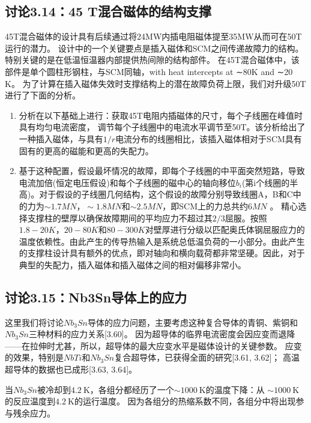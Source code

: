 \subsection{讨论3.14：45 T混合磁体的结构支撑}
45T混合磁体的设计具有后续通过将24MW内插电阻磁体提至35MW从而可在50T运行的潜力。
设计中的一个关键要点是插入磁体和SCM之间传递故障力的结构。
特别关键的是在低温恒温器内部提供热间隙的结构部件。
在45T混合磁体中，该部件是单个圆柱形钢柱，与SCM同轴，with heat intercepts at ∼80K and ∼20 K。
为了计算在插入磁体失效时支撑结构上的潜在故障负荷上限，我们对升级50T进行了下面的分析。
\begin{enumerate}
	\item 分析在以下基础上进行：获取45T电阻内插磁体的尺寸，每个子线圈在峰值时具有均匀电流密度，
	调节每个子线圈中的电流水平调节至50T。该分析给出了一种插入磁体，与具有$1 / r$电流分布的线圈相比，该插入磁体相对于SCM具有固有的更高的磁能和更高的失配力。
	
	\item 基于这种配置，假设最坏情况的故障，即每个子线圈的中平面突然短路，导致电流加倍(恒定电压假设)和每个子线圈的磁中心的轴向移位$b_i$(第i个线圈的半高)。对于假设的子线圈几何结构，这个假设的故障分别导致线圈A，B和C中的力为$\sim 1.7 MN，\sim 1.8 MN$和$\sim 2.5 MN$，即SCM上的力总共约$6 MN$ 。
	精心选择支撑柱的壁厚以确保故障期间的平均应力不超过其$2/3$屈服。按照$1.8-20 K，20-80 K$和$80-300 K$对壁厚进行分级以匹配奥氏体钢屈服应力的温度依赖性。由此产生的传导热输入是系统总低温负荷的一小部分。由此产生的支撑柱设计具有额外的优点，即对轴向和横向载荷都非常坚硬。因此，对于典型的失配力，插入磁体和插入磁体之间的相对偏移非常小。
\end{enumerate}
\newpage



\subsection{讨论3.15：Nb3Sn导体上的应力}
这里我们将讨论$Nb_3Sn$导体的应力问题，主要考虑这种复合导体的青铜、紫铜和$Nb_3Sn$三种材料的应力关系[3.60]。
因为超导体的临界电流密度会因应变而退降——在拉伸时尤甚，所以，超导体的最大应变水平是磁体设计的关键参数。
应变的效果，特别是$NbTi$和$Nb_3Sn$复合超导体，已获得全面的研究[3.61, 3.62]；
高温超导体的数据也已成形[3.63, 3.64]。

当$Nb_3Sn$被冷却到$4.2\ \mathrm{K}$，各组分都经历了一个$\sim 1000\ \mathrm{K}$的温度下降：从
$\sim 1000\ \mathrm{K}$的反应温度到$4.2\ \mathrm{K}$的运行温度。
因为各组分的热缩系数不同，各组分中将出现参与残余应力。

